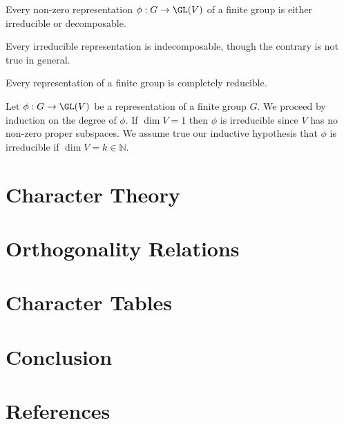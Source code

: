 \begin{coro}
	Every  non-zero representation $\phi : G \to \GL(V)$ of a finite group is either irreducible or decomposable.
\end{coro}

\begin{prop}
	Every irreducible representation is indecomposable, though the contrary is not true in general.
\end{prop}

\begin{theo}
	Every representation of a finite group is completely reducible.
\end{theo}
\begin{proo*}
	Let $\phi : G \to \GL(V)$ be a representation of a finite group $G$. We proceed by induction on the degree of $\phi$. If $\dim V = 1$ then $\phi$ is irreducible since $V$ has no non-zero proper subspaces. We assume true our inductive hypothesis that $\phi$ is irreducible if $\dim V = k \in \mathbb{N}$.
\end{proo*}

\newpage
\section{Character Theory}

\newpage
\section{Orthogonality Relations}

\newpage
\section{Character Tables}

\newpage
\section{Conclusion}
\newpage
\section{References}
\printbibliography[heading=none]

